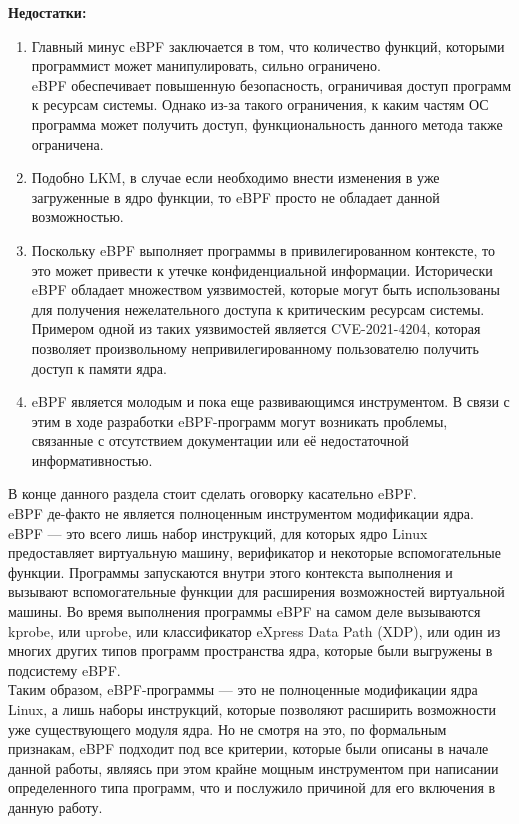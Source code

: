 \textbf{Недостатки:}

\begin{enumerate}
    \item Главный минус eBPF заключается в том, что количество функций, которыми программист может манипулировать, сильно ограничено.\\
    eBPF обеспечивает повышенную безопасность, ограничивая доступ программ к ресурсам системы.
    Однако из-за такого ограничения, к каким частям ОС программа может получить доступ, функциональность данного метода также ограничена.
    \item Подобно LKM, в случае если необходимо внести изменения в уже загруженные в ядро функции, то eBPF просто не обладает данной возможностью.
    \item Поскольку eBPF выполняет программы в привилегированном контексте, то это может привести к утечке конфиденциальной информации.
    Исторически eBPF обладает множеством уязвимостей, которые могут быть использованы для получения нежелательного доступа к критическим ресурсам системы.
    Примером одной из таких уязвимостей является CVE-2021-4204\cite{cve-2021-4204}, которая позволяет произвольному непривилегированному пользователю получить доступ к памяти ядра.
    \item eBPF является молодым и пока еще развивающимся инструментом.
    В связи с этим в ходе разработки eBPF-программ могут возникать проблемы, связанные с отсутствием документации или её недостаточной информативностью.
\end{enumerate}
\newpage
\noindent В конце данного раздела стоит сделать оговорку касательно eBPF\@.
\vspace{5mm}\\
eBPF де-факто не является полноценным инструментом модификации ядра.\\
eBPF — это всего лишь набор инструкций, для которых ядро Linux предоставляет виртуальную машину, верификатор и некоторые вспомогательные функции.
Программы запускаются внутри этого контекста выполнения и вызывают вспомогательные функции для расширения возможностей виртуальной машины.
Во время выполнения программы eBPF на самом деле вызываются kprobe, или uprobe, или классификатор eXpress Data Path (XDP),
или один из многих других типов программ пространства ядра, которые были выгружены в подсистему eBPF\@.
\\
Таким образом, eBPF-программы — это не полноценные модификации ядра Linux, а лишь наборы инструкций, которые позволяют расширить возможности уже существующего модуля ядра\@.
Но не смотря на это, по формальным признакам, eBPF подходит под все критерии, которые были описаны в начале данной работы,
являясь при этом крайне мощным инструментом при написании определенного типа программ, что и послужило причиной для его включения в данную работу.
\newpage

